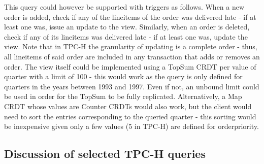 \documentclass[sigplan,review,anonymous]{acmart}
\begin{document}
This query could however be supported with triggers as follows.
When a new order is added, check if any of the lineitems of the order was delivered late - if at least one was, issue an update to the view.
Similarly, when an order is deleted, check if any of its lineitems was delivered late - if at least one was, update the view.
Note that in TPC-H the granularity of updating is a complete order - thus, all lineitems of said order are included in any transaction that adds or removes an order.
The view itself could be implemented using a TopSum CRDT per value of quarter with a limit of 100 - this would work as the query is only defined for quarters in the years between 1993 and 1997. %
Even if not, an unbound limit could be used in order for the TopSum to be fully replicated. %
Alternatively, a Map CRDT whose values are Counter CRDTs would also work, but the client would need to sort the entries corresponding to the queried quarter - this sorting would be inexpensive given only a few values (5 in TPC-H) are defined for orderpriority. %




\subsection{Discussion of selected TPC-H queries}
\label{subsec:implementedQueries}
\end{document}
